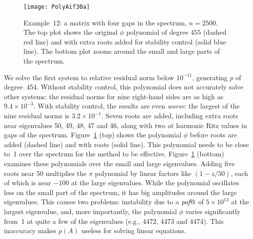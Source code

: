\documentclass{siamart}
\makeatletter
\def\pof{\mbox{{\it pof}}@}
\makeatother
\begin{document}
\begin{figure}[b!]
\begin{center}
\texttt{[image: PolyAif30a]}
\end{center}
\vspace{-5pt}
\caption{Example~12:  a matrix with four gaps in the spectrum, $n=2500$.  The top plot shows the original $\phi$ polynomial of degree $455$ (dashed red line) and with extra roots added for stability control (solid blue line).  The bottom plot zooms around the small and large parts of the spectrum.}
\label{fig:GapExa}
\end{figure}

We solve the first system to relative residual norm below $10^{-11}$, generating $p$ of degree~454.  Without  stability control, this polynomial does not accurately solve other systems:  the residual norms for nine right-hand sides are as high as $9.4\times 10^{-3}$.  With stability control, the results are even \emph{worse}: the largest of the nine residual norms is $3.2\times 10^{-1}$.  Seven roots are added, including extra roots near eigenvalues 50, 49, 48, 47 and 46, along with two at harmonic Ritz values in gaps of the spectrum.  
Figure~\ref{fig:GapExa} (top) shows the polynomial $\phi$ before  roots are added (dashed line) and with roots (solid line).  This polynomial needs to be close to~1 over the spectrum for the method to be effective.  Figure~\ref{fig:GapExa} (bottom) examines these polynomials over the small and large eigenvalues. 
Adding five roots near 50 multiplies the $\pi$ polynomial by linear factors like $(1 - z/50)$,  each of which is near $-100$ at the large eigenvalues.  While the polynomial oscillates less on the small part of the spectrum, it has big amplitudes around the large eigenvalues.  This causes two problems: instability due to a $\pof$ of $5\times 10^{13}$ at the largest eigenvalue, and, more importantly, the polynomial $\phi$ varies significantly from~1 at quite a few of the eigenvalues (e.g.,  4472, 4473 and 4474).  This inaccuracy makes $p(A)$ useless for solving linear equations.  
\end{document}
